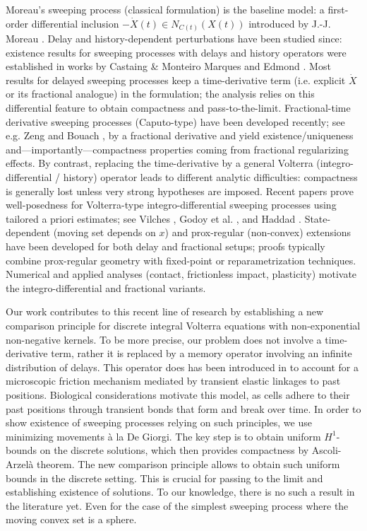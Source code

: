 \documentclass[]{jnsao}
\begin{document}
Moreau's sweeping process (classical formulation) 
is the baseline model: a first-order differential inclusion 
  $-\dot X(t)\in N_{C(t)}(X(t))$ introduced by J.-J. Moreau \cite{Moreau1999}.
  Delay and history-dependent perturbations have been studied since: 
  existence results for sweeping processes with delays and history operators were 
  established in works by Castaing \& Monteiro Marques \cite{Castaing1997} and 
  Edmond \cite{Edmond2006}.
 Most results for delayed sweeping processes keep a time-derivative
 term (i.e. explicit $\dot X$ or its fractional analogue) in the formulation; 
 the analysis relies on this differential feature to obtain compactness and pass-to-the-limit.
Fractional-time derivative sweeping processes (Caputo-type) have been developed recently; 
  see e.g. Zeng \cite{Zeng2023} and Bouach \cite{Bouach2025}, 
  by a fractional derivative and yield existence/uniqueness 
   and—importantly—compactness properties coming from fractional regularizing effects.
By contrast, replacing the time-derivative by a general Volterra (integro-differential / history) 
operator leads to different analytic difficulties: compactness is generally lost unless very 
strong hypotheses are imposed. 
Recent papers prove well-posedness for Volterra-type integro-differential 
sweeping processes using tailored a priori estimates; 
see Vilches \cite{Vilches2024}, Godoy et al. \cite{Godoy2024}, and Haddad \cite{Haddad2025}.
State-dependent (moving set depends on $x$) and prox-regular (non-convex) extensions have been 
developed for both delay and fractional setups; proofs typically combine prox-regular geometry 
with fixed-point or reparametrization techniques.
Numerical and applied analyses (contact, frictionless impact, plasticity) 
motivate the integro-differential and fractional variants.

Our work contributes to this recent line of research by establishing a new comparison principle
for discrete integral Volterra equations with non-exponential non-negative kernels. 
To be more precise, our problem does not involve a time-derivative term,
rather it is replaced by a memory operator involving an infinite distribution of delays.
This operator does has been introduced in \cite{OelzSch10} to account
for a microscopic friction mechanism mediated by transient elastic linkages to past positions.
Biological considerations motivate this model, as cells adhere to their past positions
through transient bonds that form and break over time.
In order to show existence of sweeping processes relying on  such principles, 
we use minimizing movements à la De Giorgi. The key step is to obtain
uniform $H^1$-bounds on the discrete solutions, which then provides
compactness by Ascoli-Arzelà theorem. The new comparison principle
allows to obtain such uniform bounds in the discrete setting.
This is crucial for passing to the limit and establishing existence of solutions.
To our knowledge, there is no such a result in the literature yet.
Even for the case of the simplest sweeping process where the moving convex set 
is a sphere.
\end{document}
